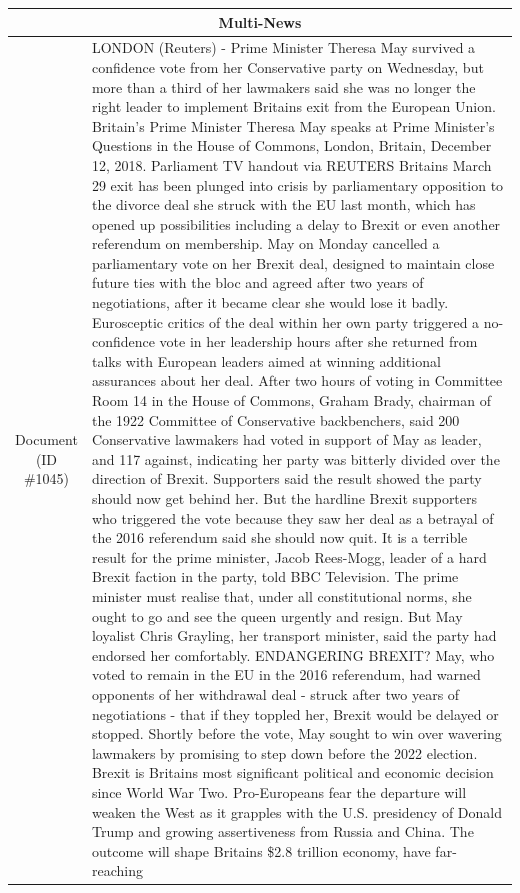 \begin{table}[h!]
\scriptsize
  \centering
  \renewcommand{\arraystretch}{1.3}
  \begin{tabular}{c|p{}}
  \hline
  \multicolumn{2}{c}{Multi-News} \\ \hline
  \makecell{Document\\(ID \#1045)} & LONDON (Reuters) - Prime Minister Theresa May survived a confidence vote from her Conservative party on Wednesday, but more than a third of her lawmakers said she was no longer the right leader to implement Britains exit from the European Union. Britain's Prime Minister Theresa May speaks at Prime Minister's Questions in the House of Commons, London, Britain, December 12, 2018. Parliament TV handout via REUTERS Britains March 29 exit has been plunged into crisis by parliamentary opposition to the divorce deal she struck with the EU last month, which has opened up possibilities including a delay to Brexit or even another referendum on membership. May on Monday cancelled a parliamentary vote on her Brexit deal, designed to maintain close future ties with the bloc and agreed after two years of negotiations, after it became clear she would lose it badly. Eurosceptic critics of the deal within her own party triggered a no-confidence vote in her leadership hours after she returned from talks with European leaders aimed at winning additional assurances about her deal. After two hours of voting in Committee Room 14 in the House of Commons, Graham Brady, chairman of the 1922 Committee of Conservative backbenchers, said 200 Conservative lawmakers had voted in support of May as leader, and 117 against, indicating her party was bitterly divided over the direction of Brexit. Supporters said the result showed the party should now get behind her. But the hardline Brexit supporters who triggered the vote because they saw her deal as a betrayal of the 2016 referendum said she should now quit. It is a terrible result for the prime minister, Jacob Rees-Mogg, leader of a hard Brexit faction in the party, told BBC Television. The prime minister must realise that, under all constitutional norms, she ought to go and see the queen urgently and resign. But May loyalist Chris Grayling, her transport minister, said the party had endorsed her comfortably. ENDANGERING BREXIT? May, who voted to remain in the EU in the 2016 referendum, had warned opponents of her withdrawal deal - struck after two years of negotiations - that if they toppled her, Brexit would be delayed or stopped. Shortly before the vote, May sought to win over wavering lawmakers by promising to step down before the 2022 election. Brexit is Britains most significant political and economic decision since World War Two. Pro-Europeans fear the departure will weaken the West as it grapples with the U.S. presidency of Donald Trump and growing assertiveness from Russia and China. The outcome will shape Britains \$2.8 trillion economy, have far-reaching \\\hline

\end{tabular}
\end{table}
